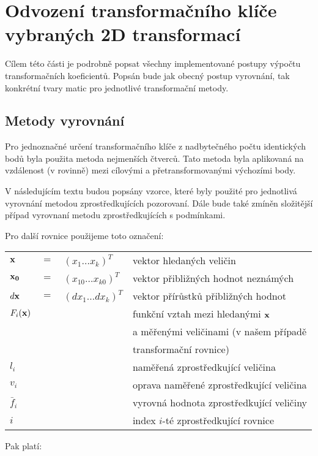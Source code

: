 \section{Odvození transformačního klíče vybraných 2D transformací}

Cílem této části je podrobně popsat všechny implementované postupy výpočtu
transformačních koeficientů. Popsán bude jak obecný postup vyrovnání, tak
konkrétní tvary matic pro jednotlivé transformační metody.
\subsection{Metody vyrovnání}
\label{kapvyr}
Pro jednoznačné určení transformačního klíče z nadbytečného počtu identických bodů byla použita metoda
nejmenších čtverců. Tato metoda byla aplikovaná na vzdálenost (v rovinně) mezi
cílovými a přetransformovanými výchozími body. 

V následujícím textu budou popsány vzorce, které byly použité pro jednotlivá
vyrovnání metodou zprostředkujících pozorovaní. Dále bude také zmíněn
složitější případ vyrovnaní metodu zprostředkujících s podmínkami.

Pro další rovnice použijeme toto označení:

\begin{table}[h]
\centering

\begin{tabular}{llll}
$ {\bf x} $&$=$& $(x_1 \ldots x_k)^T$  & vektor hledaných veličin\\
$ {\bf x_0} $&$=$&$(x_{10} \ldots x_{k0})^T$  & vektor přibližných hodnot
neznámých\\
$ d {\bf x} $&$=$&$(dx_1 \ldots dx_k)^T$  & vektor přírůstků přibližných
hodnot\\

$ F_i(\bf x)$ &&& funkční vztah mezi hledanými $ \bf x$ \\
 &&&  a měřenými veličinami (v našem případě\\
&&& transformační rovnice)\\
$ l_i$ &&& naměřená zprostředkující veličina \\
$ v_i$ &&& oprava naměřené zprostředkující veličina \\
$ \bar{f}_i$ &&& vyrovná hodnota zprostředkující veličiny \\
$i$ &&& index $i$-té zprostředkující rovnice
\end{tabular}
\end{table}

Pak platí:

